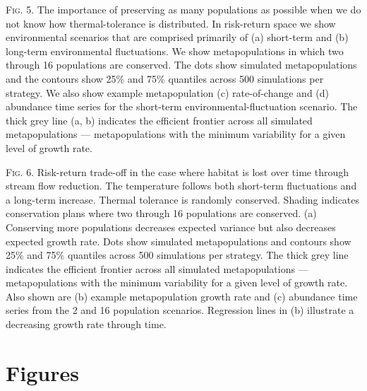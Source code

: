 \documentclass[12pt,english]{article}
\begin{document}
\begin{spacing}{1.9}

\bigskip
\noindent
\textsc{Fig. 5}. The importance of preserving as many populations as possible when we do not know how thermal-tolerance is distributed. In risk-return space we show environmental scenarios that are comprised primarily of (a) short-term and (b) long-term environmental fluctuations. We show metapopulations in which two through 16 populations are conserved. The dots show simulated metapopulations and the contours show 25\% and 75\% quantiles across 500 simulations per strategy. We also show example metapopulation (c) rate-of-change and (d) abundance time series for the short-term environmental-fluctuation scenario. The thick grey line (a, b) indicates the efficient frontier across all simulated metapopulations --- metapopulations with the minimum variability for a given level of growth rate.

\bigskip
\noindent
\textsc{Fig. 6}. Risk-return trade-off in the case where habitat is lost over time through stream flow reduction. The temperature follows both short-term fluctuations and a long-term increase. Thermal tolerance is randomly conserved. Shading indicates conservation plans where two through 16 populations are conserved. (a) Conserving more populations decreases expected variance but also decreases expected growth rate. Dots show simulated metapopulations and contours show 25\% and 75\% quantiles across 500 simulations per strategy. The thick grey line indicates the efficient frontier across all simulated metapopulations --- metapopulations with the minimum variability for a given level of growth rate. Also shown are (b) example metapopulation growth rate and (c) abundance time series from the 2 and 16 population scenarios. Regression lines in (b) illustrate a decreasing growth rate through time.

\clearpage

\section{Figures}


\end{spacing}


\begin{spacing}{1.1}

%

\end{spacing}
\end{document}
